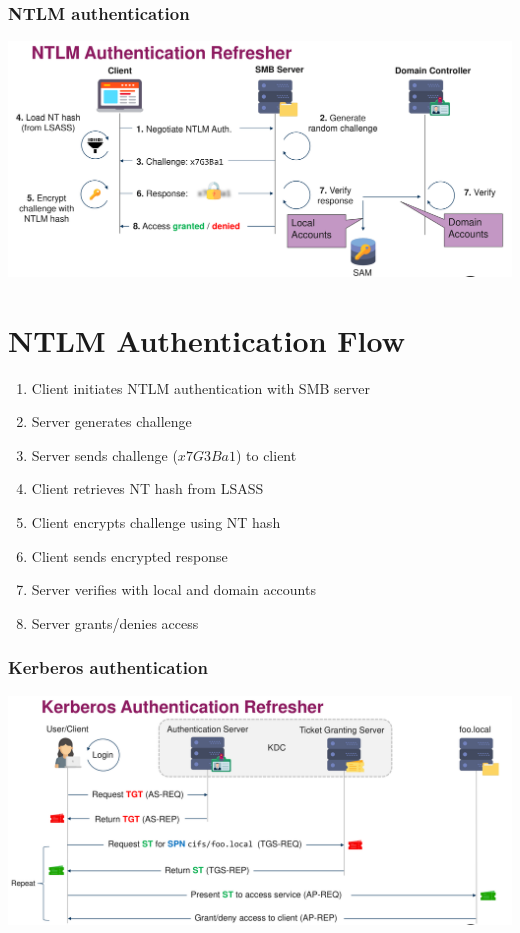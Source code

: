 \subsubsection{NTLM authentication}
\includegraphics[width=\textwidth]{resources/05-ntlm-authentication.png}
\section*{NTLM Authentication Flow}
\begin{enumerate}
\item Client initiates NTLM authentication with SMB server
\item Server generates challenge
\item Server sends challenge ($x7G3Ba1$) to client
\item Client retrieves NT hash from LSASS
\item Client encrypts challenge using NT hash
\item Client sends encrypted response
\item Server verifies with local and domain accounts
\item Server grants/denies access
\end{enumerate}

\subsubsection{Kerberos authentication}
\includegraphics[width=\textwidth]{resources/05-kerberos-authentication.png}
